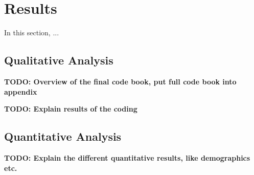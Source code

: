 \section{Results}
\label{sec:results}

In this section, ...


\subsection{Qualitative Analysis}
\label{qual_res}

\textbf{TODO: Overview of the final code book, put full code book into appendix}

\textbf{TODO: Explain results of the coding}


\subsection{Quantitative Analysis}
\label{quant_res}

\textbf{TODO: Explain the different quantitative results, like demographics etc.}